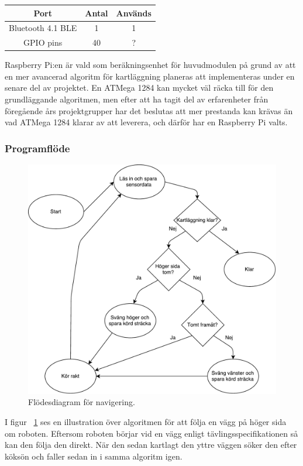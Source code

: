\documentclass{article}
\begin{document}
\begin{table}[H]
   \centering
  \begin{tabular}{ | c | c | c | }
    \hline
    \textbf{Port} & \textbf{Antal} & \textbf{Används} \\
    \hline
    Bluetooth 4.1 BLE & 1 & 1\\
    GPIO pins & 40 & ? \\
    \hline
  \end{tabular}
\end{table}

Raspberry Pi:en är vald som beräkningsenhet för huvudmodulen på grund av att en mer avancerad algoritm för kartläggning planeras att implementeras under en senare del av projektet. En ATMega 1284 kan mycket väl räcka till för den grundläggande algoritmen, men efter att ha tagit del av erfarenheter från föregående års projektgrupper har det beslutas att mer prestanda kan krävas än vad ATMega 1284 klarar av att leverera, och därför har en Raspberry Pi valts. 

\subsubsection{Programflöde}
\begin{figure}[H]
\centering
\includegraphics[scale=0.6]{navigering_flowchart}
\caption{Flödesdiagram för navigering.}
\label{fig:navigering_flowchart}
\end{figure}
I figur ~\ref{fig:navigering_flowchart} ses en illustration över algoritmen för att följa en vägg på höger sida om roboten. Eftersom roboten börjar vid en vägg enligt tävlingsspecifikationen så kan den följa den direkt. När den sedan kartlagt den yttre väggen söker den efter köksön och faller sedan in i samma algoritm igen.
\end{document}
